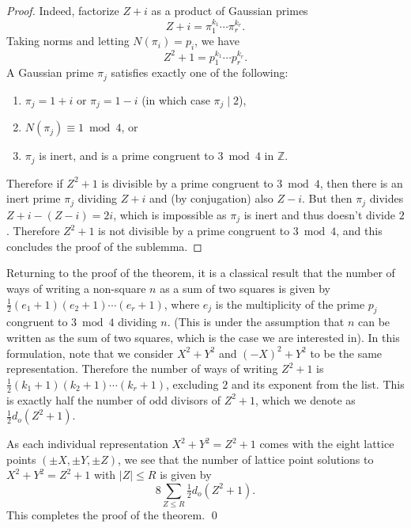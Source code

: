 \begin{proof}
  Indeed, factorize $Z + i$ as a product of Gaussian primes
  \begin{equation}
    Z + i = \pi_1^{k_1} \cdots \pi_r^{k_r}.
  \end{equation}
  Taking norms and letting $N(\pi_i) = p_i$, we have
  \begin{equation}
    Z^2 + 1 = p_1^{k_1} \cdots p_r^{k_r}.
  \end{equation}
  A Gaussian prime $\pi_j$ satisfies exactly one of the following:
  \begin{enumerate}
    \item $\pi_j = 1 + i$ or $\pi_j = 1 - i$ (in which case $\pi_j \mid 2$),
    \item $N(\pi_j) \equiv 1 \bmod 4$, or
    \item $\pi_j$ is inert, and is a prime congruent to $3 \bmod 4$ in $\mathbb{Z}$.
  \end{enumerate}
  Therefore if $Z^2+1$ is divisible by a prime congruent to $3 \bmod 4$, then there is an
  inert prime $\pi_j$ dividing $Z+i$ and (by conjugation) also $Z-i$.
  But then $\pi_j$ divides $Z+i - (Z-i) = 2i$, which is impossible as $\pi_j$ is inert and
  thus doesn't divide $2$.
  Therefore $Z^2+1$ is not divisible by a prime congruent to $3 \bmod 4$, and this
  concludes the proof of the sublemma.
\end{proof}



Returning to the proof of the theorem, it is a classical result that the number of ways of
writing a non-square $n$ as a sum of two squares is given by
$\frac{1}{2}(e_1+1)(e_2+1)\cdots(e_r+1)$, where $e_j$ is the multiplicity of the prime
$p_j$ congruent to $3 \bmod 4$ dividing $n$.
(This is under the assumption that $n$ can be written as the sum of two squares, which is
the case we are interested in).
In this formulation, note that we consider $X^2 + Y^2$ and $(-X)^2 + Y^2$ to be the same
representation.
Therefore the number of ways of writing $Z^2 + 1$ is $\frac{1}{2}(k_1+1)(k_2+1) \cdots
(k_r+1)$, excluding $2$ and its exponent from the list.
This is exactly half the number of odd divisors of $Z^2 + 1$, which we denote as
$\frac{1}{2}d_o(Z^2 + 1)$.



As each individual representation $X^2 + Y^2 = Z^2 + 1$ comes with the eight lattice
points $(\pm X, \pm Y, \pm Z)$, we see that the number of lattice point solutions to $X^2
+ Y^2 = Z^2 + 1$ with $\lvert Z \rvert \leq R$ is given by
\begin{equation}
  8 \sum_{Z \leq R}\tfrac{1}{2}d_o(Z^2+1).
\end{equation}
This completes the proof of the theorem. \qed{}




